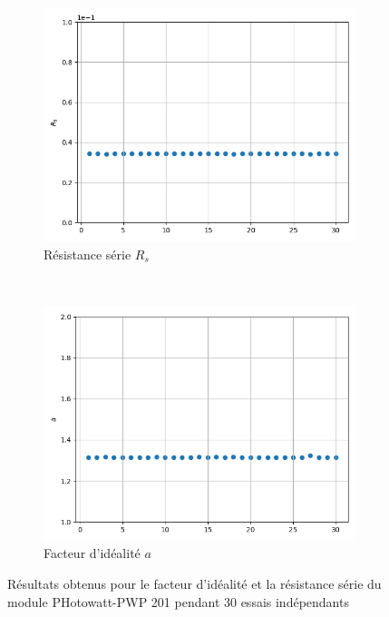 \begin{figure}[t!]
    \centering
    \begin{subfigure}[b]{0.45\textwidth}
        \includegraphics[width=\textwidth]{resources/pwp/rsconsist.png}
        \caption{Résistance série $R_s$}
    \end{subfigure}
    ~
    \begin{subfigure}[b]{0.45\textwidth}
        \includegraphics[width=\textwidth]{resources/pwp/aconsist.png}
        \caption{Facteur d'idéalité $a$}
    \end{subfigure}
    \caption{Résultats obtenus pour le facteur d'idéalité et la résistance série du module PHotowatt-PWP 201 pendant 30 essais indépendants}
    \label{fig:paramconsist}
\end{figure}

